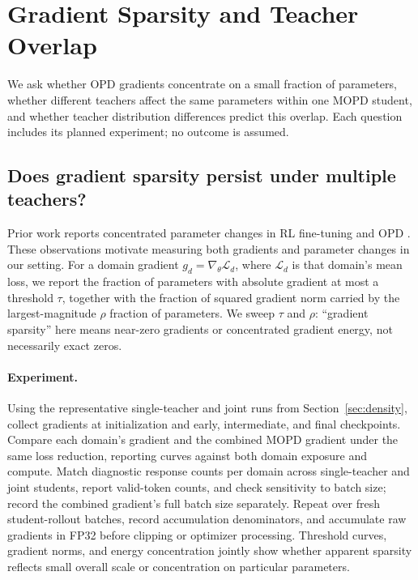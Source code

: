 \section{Gradient Sparsity and Teacher Overlap}
\label{sec:subnetworks}

We ask whether OPD gradients concentrate on a small fraction of parameters,
whether different teachers affect the same parameters within one MOPD
student, and whether teacher distribution differences predict this overlap.
Each question includes its planned experiment; no outcome is assumed.

\subsection{Does gradient sparsity persist under multiple teachers?}

Prior work reports concentrated parameter changes in RL fine-tuning
\citep{mukherjee2025subnetworks} and OPD
\citep{yu2026denseupdates,shen2026opdgeometry}. These observations motivate
measuring both gradients and parameter changes in our setting.
For a domain gradient $g_d=\nabla_\theta\mathcal L_d$, where
$\mathcal L_d$ is that domain's mean loss, we report the fraction of parameters with
absolute gradient at most a threshold $\tau$, together with the fraction
of squared gradient norm carried by the largest-magnitude $\rho$ fraction
of parameters. We sweep $\tau$ and $\rho$: ``gradient sparsity'' here means
near-zero gradients or concentrated gradient energy, not necessarily
exact zeros.

\paragraph{Experiment.}
Using the representative single-teacher and joint runs from
Section~\ref{sec:density}, collect gradients at initialization and
early, intermediate, and final checkpoints. Compare each domain's gradient
and the combined MOPD gradient under the same loss reduction, reporting
curves against both domain exposure and compute. Match diagnostic response
counts per domain across single-teacher and joint students, report valid-token
counts, and check sensitivity to batch size; record the combined gradient's
full batch size separately. Repeat over fresh student-rollout batches,
record accumulation denominators, and
accumulate raw gradients in FP32 before clipping or optimizer processing.
Threshold curves, gradient norms, and energy concentration jointly show
whether apparent sparsity reflects small overall scale or concentration
on particular parameters.

